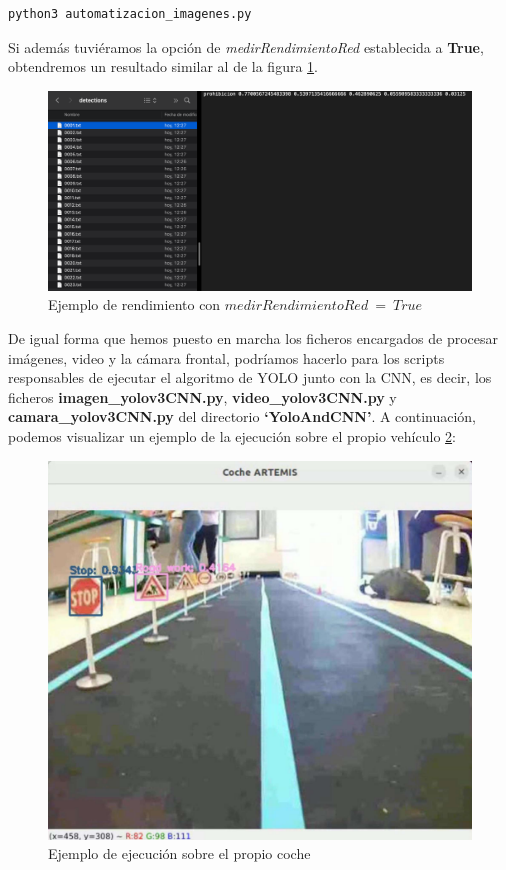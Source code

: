 \begin{lstlisting}
python3 automatizacion_imagenes.py
\end{lstlisting}

Si además tuviéramos la opción de \textit{medirRendimientoRed} establecida a \textbf{True}, obtendremos un resultado similar al de la figura \ref{detecc4}.

\begin{figure}[H]
	\centering
	\includegraphics[width=\textwidth]{Imagenes/AnexoI_Manual/AA/deteccion4.pdf}
	\caption{Ejemplo de rendimiento con $medirRendimientoRed \ =\ True$}
	\label{detecc4}
\end{figure}

De igual forma que hemos puesto en marcha los ficheros encargados de procesar imágenes, video y la cámara frontal, podríamos hacerlo para los scripts responsables de ejecutar el algoritmo de YOLO junto con la CNN, es decir, los ficheros \textbf{imagen_yolov3CNN.py}, \textbf{video_yolov3CNN.py} y \textbf{camara_yolov3CNN.py} del directorio \textbf{‘YoloAndCNN’}. A continuación, podemos visualizar un ejemplo de la ejecución sobre el propio vehículo \ref{yolocoche}:

\begin{figure}[H]
	\centering
	\includegraphics[width=\textwidth]{Imagenes/AnexoI_Manual/AA/YoloCNN_coche.pdf}
	\caption{Ejemplo de ejecución sobre el propio coche}
	\label{yolocoche}
\end{figure}

